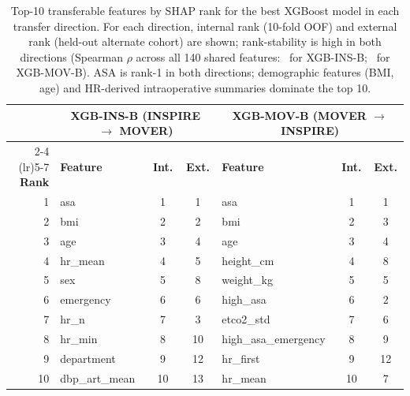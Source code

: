 \documentclass[11pt,a4paper]{article}
\begin{document}
\begin{table}[H]
\centering
\caption{Top-10 transferable features by SHAP rank for the best XGBoost
model in each transfer direction. For each direction, internal rank
(10-fold OOF) and external rank (held-out alternate cohort) are shown;
rank-stability is high in both directions (Spearman $\rho$ across all 140
shared features: \pnShapSpearmanRhoXgbInsBFull\ for XGB-INS-B;
\pnShapSpearmanRhoXgbMovBFull\ for XGB-MOV-B). ASA is rank-1 in both
directions; demographic features (BMI, age) and HR-derived intraoperative
summaries dominate the top 10.}
\label{tab:transferable_features}
\setlength{\tabcolsep}{4pt}
\small
\begin{tabular}{rl@{\hskip 1em}cc@{\hskip 2em}l@{\hskip 1em}cc}
\toprule
& \multicolumn{3}{c}{\textbf{XGB-INS-B (INSPIRE $\to$ MOVER)}}
& \multicolumn{3}{c}{\textbf{XGB-MOV-B (MOVER $\to$ INSPIRE)}} \\
\cmidrule(lr){2-4} \cmidrule(lr){5-7}
\textbf{Rank} & \textbf{Feature} & \textbf{Int.} & \textbf{Ext.} & \textbf{Feature} & \textbf{Int.} & \textbf{Ext.} \\
\midrule
1  & asa            & 1 & 1  & asa                & 1 & 1 \\
2  & bmi            & 2 & 2  & bmi                & 2 & 3 \\
3  & age            & 3 & 4  & age                & 3 & 4 \\
4  & hr\_mean       & 4 & 5  & height\_cm         & 4 & 8 \\
5  & sex            & 5 & 8  & weight\_kg         & 5 & 5 \\
6  & emergency      & 6 & 6  & high\_asa          & 6 & 2 \\
7  & hr\_n          & 7 & 3  & etco2\_std         & 7 & 6 \\
8  & hr\_min        & 8 & 10 & high\_asa\_emergency & 8 & 9 \\
9  & department     & 9 & 12 & hr\_first          & 9 & 12 \\
10 & dbp\_art\_mean & 10 & 13 & hr\_mean           & 10 & 7 \\
\bottomrule
\end{tabular}
\end{table}
\end{document}
